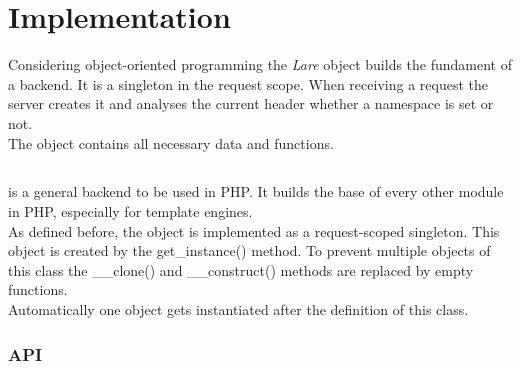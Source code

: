 \section{Implementation\label{chap:implementation}}

Considering object-oriented programming the \emph{Lare} object builds the fundament of a \lare{} backend.
It is a singleton in the request scope.
When receiving a request the server creates it and analyses the current \http{} header whether a namespace is set or not.
\\
The \lare{} object contains all necessary data and functions.


\subsection{\phpLare{}}
\phpLare{} is a general \lare{} backend to be used in PHP.
It builds the base of every other \lare{} module in PHP, especially for template engines.
\\
As defined before, the \lare{} object is implemented as a request-scoped singleton.
This object is created by the get\_instance() method.
To prevent multiple objects of this class the \_\_clone() and  \_\_construct() methods are replaced by empty functions.
\\
Automatically one object gets instantiated after the definition of this class.


\subsubsection{API}

